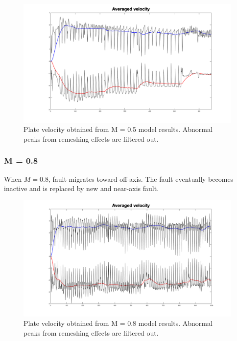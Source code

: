 \documentclass[letterpaper,12pt,notitle]{memphisthesis}                     %
\begin{document}
\begin{figure}[!htb]
	\centering
	\includegraphics[width=0.99\linewidth]{./figs/m05vel.png}
	\caption{Plate velocity obtained from M = 0.5 model results. Abnormal peaks from remeshing effects are filtered out.}
	\label{fig:m05vel}
\end{figure}

\subsubsection{M = 0.8}

When $M=0.8$, fault migrates toward off-axis. The fault eventually becomes inactive and is replaced by new and near-axis fault.

\begin{figure}[!htb]
	\centering
	\includegraphics[width=0.99\linewidth]{./figs/m08vel.png}
	\caption{Plate velocity obtained from M = 0.8 model results. Abnormal peaks from remeshing effects are filtered out.}
	\label{fig:m08vel}
\end{figure}
\end{document}
